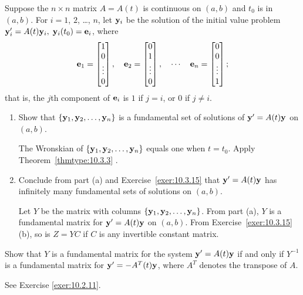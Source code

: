 \documentclass{ximera}
\begin{document}
\begin{problem}\label{exer:10.3.16}
 Suppose the $n\times n$  matrix $A=A(t)$ is
continuous on $(a,b)$ and $t_0$ is in $(a,b)$.
 For $i=1$, $2$, \dots, $n$, let ${\bf y}_i$ be the solution of the initial
value
problem ${\bf y}_i'=A(t){\bf y}_i,\; {\bf y}_i(t_0)={\bf e}_i$, where
$$
{\bf e}_1=\begin{bmatrix} 1\\0\\ \vdots\\0\end{bmatrix},\quad
 {\bf e}_2=\begin{bmatrix} 0\\1\\
\vdots\\0\end{bmatrix},\quad\cdots\quad
 {\bf e}_n=\begin{bmatrix} 0\\0\\ \vdots\\1\end{bmatrix};
$$
that is, the $j$th component of ${\bf e}_i$ is $1$ if $j=i$, or $0$ if
$j\ne i$.

\begin{enumerate}
\item %
 Show that $\{{\bf y}_1,{\bf y}_2,\dots,{\bf y}_n\}$ is a fundamental set of
solutions of ${\bf y}'=A(t){\bf y}$ on  $(a,b)$.

\begin{solution}
    The Wronskian  of $\{{\bf y}_1,{\bf y}_2,\dots,{\bf y}_n\}$ equals
one when $t=t_0$. Apply Theorem~\ref{thmtype:10.3.3} .
\end{solution}

\item %
 Conclude from part (a) and Exercise~\ref{exer:10.3.15}  that ${\bf y}'=
A(t){\bf y}$ has infinitely many fundamental sets of solutions on
$(a,b)$.

\begin{solution}
    Let $Y$ be the matrix with columns $\{{\bf y}_1,{\bf y}_2,\dots,{\bf
y}_n\}$. From part (a), $Y$ is a fundamental matrix for ${\bf
y}'=A(t){\bf y}$ on $(a,b)$. From Exercise~\ref{exer:10.3.15} (b),
so is $Z=YC$ if $C$ is any invertible constant matrix.
\end{solution}
\end{enumerate}
\end{problem}

\begin{problem}\label{exer:10.3.17}
 Show that $Y$ is a
fundamental matrix for the system ${\bf y}'=A(t){\bf y}$ if and only
if $Y^{-1}$ is a fundamental matrix for ${\bf y}'=-
A^T(t){\bf y}$, where $A^T$ denotes the transpose of $A$.
\begin{hint}
    See Exercise \ref{exer:10.2.11}.
\end{hint}
\end{problem}
\end{document}

